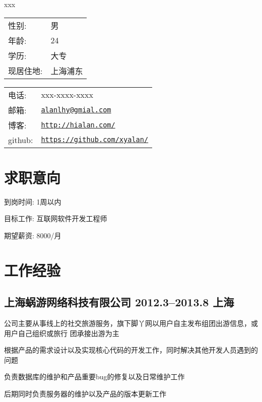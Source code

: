 \documentclass[11pt,a4paper]{article}
\def\name{xxx}
\renewenvironment{itemize}{
  \begin{list}{}{
    \setlength{\leftmargin}{1.5em}
  }
}{
  \end{list}
}
\begin{document}
{\huge \name}


\vspace{0.25in}

\begin{minipage}{0.45\linewidth}
  \begin{tabular}{ll}
    性别: & 男\\
    年龄: & 24\\
    学历: & 大专 \\
    现居住地: & 上海浦东 \\
  \end{tabular}
\end{minipage}
\begin{minipage}{0.45\linewidth}
  \begin{tabular}{ll}
    电话: & xxx-xxxx-xxxx \\
    邮箱: & \href{mailto:alanlhy@gmail.com}{\tt alanlhy@gmial.com} \\
    博客: & \href{http://hialan.com/}{\tt http://hialan.com/} \\
    github: & \href{https://github.com/xyalan}{\tt https://github.com/xyalan/} \\
  \end{tabular}
\end{minipage}


\section*{求职意向}

\begin{itemize}
\item 到岗时间: 1周以内
\item 目标工作: 互联网软件开发工程师
\item 期望薪资: 8000/月
\end{itemize}


\section*{工作经验}

\subsection*{上海蜗游网络科技有限公司 2012.3--2013.8 上海}

\begin{itemize}
  \item 公司主要从事线上的社交旅游服务，旗下脚丫网以用户自主发布组团出游信息，或用户自己组织或旅行
    团承接出游为主
  \item 根据产品的需求设计以及实现核心代码的开发工作，同时解决其他开发人员遇到的问题
  \item 负责数据库的维护和产品重要bug的修复以及日常维护工作
  \item 后期同时负责服务器的维护以及产品的版本更新工作
\end{itemize}
\end{document}
